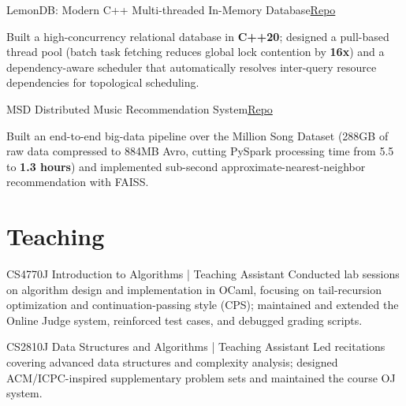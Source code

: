 \begin{joblong}{LemonDB: Modern C++ Multi-threaded In-Memory Database}{\href{https://github.com/zty2004/ECE4821Jp2}{Repo}}
\item Built a high-concurrency relational database in \textbf{C++20}; designed a pull-based thread pool (batch task fetching reduces global lock contention by \textbf{16x}) and a dependency-aware scheduler that automatically resolves inter-query resource dependencies for topological scheduling.
\end{joblong}

\begin{joblong}{MSD Distributed Music Recommendation System}{\href{https://github.com/zty2004/ECE4721J}{Repo}}
\item Built an end-to-end big-data pipeline over the Million Song Dataset (288GB of raw data compressed to 884MB Avro, cutting PySpark processing time from 5.5 to \textbf{1.3 hours}) and implemented sub-second approximate-nearest-neighbor recommendation with FAISS.
\end{joblong}


\section{Teaching}

\begin{jobshort}{CS4770J Introduction to Algorithms | Teaching Assistant}{\DateTAEn}
Conducted lab sessions on algorithm design and implementation in OCaml, focusing on tail-recursion optimization and continuation-passing style (CPS); maintained and extended the Online Judge system, reinforced test cases, and debugged grading scripts.
\end{jobshort}

\begin{jobshort}{CS2810J Data Structures and Algorithms | Teaching Assistant}{\DateTAEn}
Led recitations covering advanced data structures and complexity analysis; designed ACM/ICPC-inspired supplementary problem sets and maintained the course OJ system.
\end{jobshort}
